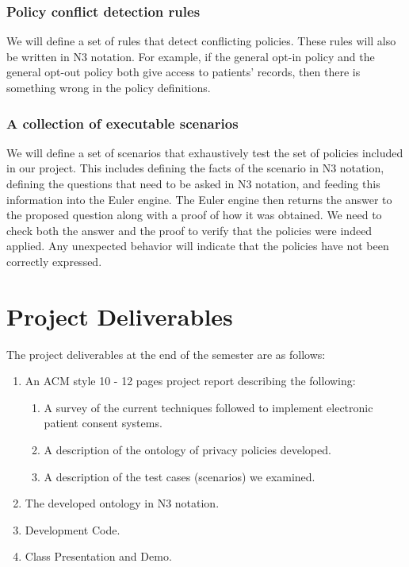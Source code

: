 \documentclass[conference]{IEEEtran}
\begin{document}
\subsubsection{Policy conflict detection rules}
We will define a set of rules that detect conflicting policies. These rules will also be written in N3 notation. For example, if the general opt-in policy and the general opt-out policy both give access to patients' records, then there is something wrong in the policy definitions.

\subsubsection{A collection of executable scenarios}
We will define a set of scenarios that exhaustively test the set of policies included in our project. This includes defining the facts of the scenario in N3 notation, defining the questions that need to be asked in N3 notation, and feeding this information into the Euler engine. The Euler engine then returns the answer to the proposed question along with a proof of how it was obtained. We need to check both the answer and the proof to verify that the policies were indeed applied. Any unexpected behavior will indicate that the policies have not been correctly expressed. 

\section{Project Deliverables}
The project deliverables at the end of the semester are as follows:
\begin{enumerate}
    \item An ACM style 10 - 12 pages project report describing the following:
\begin{enumerate}
\item A survey of the current techniques followed to implement electronic patient consent systems.
\item A description of the ontology of privacy policies developed.
\item A description of the test cases (scenarios) we examined.
\end{enumerate}
\item The developed ontology in N3 notation.
\item Development Code.
\item Class Presentation and Demo.
\end{enumerate}





\end{document}
